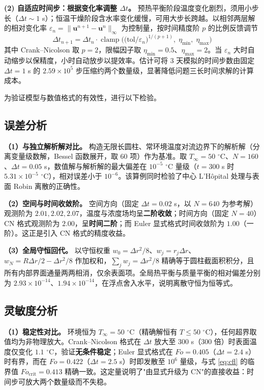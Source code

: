 \documentclass[12pt,a4paper]{ctexart}
\begin{document}
\textbf{(2) 自适应时间步：根据变化率调整 $\Delta t$。} 预热平衡阶段温度变化剧烈，须用小步长（$\Delta t\sim1$ s）；恒温干燥阶段含水率变化缓慢，可用大步长跨越。以相邻两层解的相对变化率 $\varepsilon_n=\|\mathbf u^{n+1}-\mathbf u^n\|_\infty$ 为控制量，按时间精度阶 $p$ 的比例反馈调节
\begin{equation}
\Delta t_{n+1}=\Delta t_{n}\cdot\operatorname{clamp}\!\Big(\big(\text{tol}/\varepsilon_n\big)^{1/(p+1)},\;\eta_{\min},\;\eta_{\max}\Big)
\label{eq:p2_adaptive}
\end{equation}
其中 Crank--Nicolson 取 $p=2$，限幅因子取 $\eta_{\min}=0.5$、$\eta_{\max}=2$。当 $\varepsilon_n$ 大时自动缩步以保精度，小时自动放步以提效率。估计可将 $3$ 天模拟的时间步数由固定 $\Delta t=1$ s 的 $2.59\times10^{5}$ 步压缩约两个数量级，显著降低问题三长时间求解的计算成本。

为验证模型与数值格式的有效性，进行以下检验。

\subsection{误差分析}
\textbf{（1）与独立解析解对比。} 构造无限长圆柱、常环境温度对流边界下的解析解（分离变量级数解，Bessel 函数展开，取 60 项）作为基准。取 $T_\infty=50$ $^\circ$C、$N=160$、$\Delta t=0.05$ s，数值解与解析解的最大偏差在 $10^{-5}$ $^\circ$C 量级（$t=300$ s 时 $5.31\times10^{-5}$ $^\circ$C），相对误差小于 $10^{-6}$。该算例同时检验了中心 L'H\^opital 处理与表面 Robin 离散的正确性。

\textbf{（2）空间与时间收敛阶。} 空间方向（固定 $\Delta t=0.02$ s，以 $N=640$ 为参考解）观测阶为 $2.01,2.02,2.07$，温度与浓度场均呈\textbf{二阶收敛}；时间方向（固定 $N=40$）CN 格式观测阶为 $2.00$，呈\textbf{时间二阶}；而 Euler 显式格式时间收敛阶为 $1.00$（一阶）。这正是引入 CN 格式的精度收益。

\textbf{（3）全局守恒回代。} 以守恒权重 $w_0=\Delta r^2/8$、$w_j=r_j\Delta r$、$w_N=R\Delta r/2-\Delta r^2/8$ 作加权和，$\sum_j w_j=\Delta r^2/8$ 精确等于圆柱截面积积分，且所有内部界面通量两两相消，仅余表面项。全局热平衡与质量平衡的相对偏差分别为 $2.93\times10^{-14}$、$1.94\times10^{-14}$，在浮点舍入水平，说明离散守恒为恒等式。

\subsection{灵敏度分析}
\textbf{（1）稳定性对比。} 环境恒为 $T_\infty=50$ $^\circ$C（精确解恒有 $T\le50$ $^\circ$C），任何超界取值均为非物理放大。Crank--Nicolson 格式在 $\Delta t$ 放大至 $300$ s（$300$ 倍）时表面温度仅变化 $1.1$ $^\circ$C，验证\textbf{无条件稳定}；Euler 显式格式在 $Fo=0.405$（$\Delta t=2.4$ s）时有界，而在 $Fo=0.422$（$\Delta t=2.5$ s）时即发散至 $10^6$ 量级，与式 \eqref{eq:cfl} 的临界值 $Fo_{\text{crit}}=0.413$ 精确一致。这定量说明了"由显式升级为 CN"的直接收益：时间步可放大两个数量级而不失稳。
\end{document}
